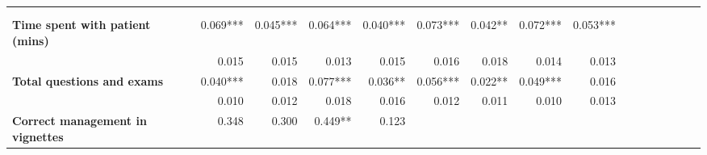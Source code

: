 \begin{tabular}{@{\extracolsep{5pt}}lrrrrrrrrrrrrrrr}
\toprule
&  &  &  &  &  &  &  &  \\
{\bf } &  &  &  &  &  &  &  &  \\
\hline
{\bf Time spent with patient (mins)} & 0.069*** & 0.045*** & 0.064*** & 0.040*** & 0.073*** & 0.042**\phantom{*} & 0.072*** & 0.053*** \\
{\bf } & 0.015\phantom{***} & 0.015\phantom{***} & 0.013\phantom{***} & 0.015\phantom{***} & 0.016\phantom{***} & 0.018\phantom{***} & 0.014\phantom{***} & 0.013\phantom{***} \\
{\bf Total questions and exams} & 0.040*** & 0.018\phantom{***} & 0.077*** & 0.036**\phantom{*} & 0.056*** & 0.022**\phantom{*} & 0.049*** & 0.016\phantom{***} \\
{\bf } & 0.010\phantom{***} & 0.012\phantom{***} & 0.018\phantom{***} & 0.016\phantom{***} & 0.012\phantom{***} & 0.011\phantom{***} & 0.010\phantom{***} & 0.013\phantom{***} \\
{\bf Correct management in vignettes} & 0.348\phantom{***} & 0.300\phantom{***} & 0.449**\phantom{*} & 0.123\phantom{***} & \phantom{***} & \phantom{***} & \phantom{***} & \phantom{***} \\

\end{tabular}
